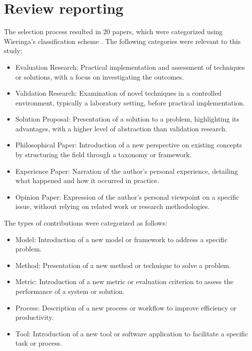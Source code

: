 \section{Review reporting}

The selection process resulted in 20 papers, which were categorized using Wieringa's classification scheme \citep{wieringa2006requirements}. The following categories were relevant to this study:


\begin{itemize}
    \item Evaluation Research: Practical implementation and assessment of techniques or solutions, with a focus on investigating the outcomes.
    \item Validation Research: Examination of novel techniques in a controlled environment, typically a laboratory setting, before practical implementation.
    \item Solution Proposal: Presentation of a solution to a problem, highlighting its advantages, with a higher level of abstraction than validation research.
    \item Philosophical Paper: Introduction of a new perspective on existing concepts by structuring the field through a taxonomy or framework.
    \item Experience Paper: Narration of the author's personal experience, detailing what happened and how it occurred in practice.
    \item Opinion Paper: Expression of the author's personal viewpoint on a specific issue, without relying on related work or research methodologies.
\end{itemize}

The types of contributions were categorized as follows:
\begin{itemize}
    \item Model: Introduction of a new model or framework to address a specific problem.
    \item Method: Presentation of a new method or technique to solve a problem.
    \item Metric: Introduction of a new metric or evaluation criterion to assess the performance of a system or solution.
    \item Process: Description of a new process or workflow to improve efficiency or productivity.
    \item Tool: Introduction of a new tool or software application to facilitate a specific task or process.
\end{itemize}

